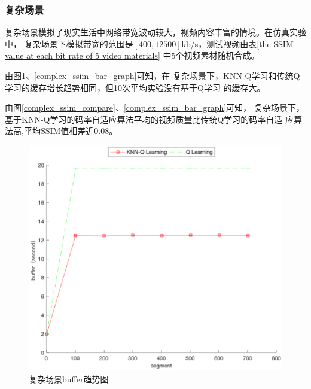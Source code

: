 \documentclass[twocolumn]{article}
\begin{document}
\subsubsection{复杂场景}
复杂场景模拟了现实生活中网络带宽波动较大，视频内容丰富的情境。在仿真实验中，
复杂场景下模拟带宽的范围是$\left[400,12500\right]$kb/s，测试视频由表\ref{the SSIM value at each bit rate of 5 video materials}
中5个视频素材随机合成。

由图\ref{complex_buffer_compare}、\ref{complex_ssim_bar_graph}可知，在
复杂场景下，KNN-Q学习和传统Q学习的缓存增长趋势相同，但10次平均实验没有基于Q学习
的缓存大。

由图\ref{complex_ssim_compare}、\ref{complex_ssim_bar_graph}可知，
复杂场景下，基于KNN-Q学习的码率自适应算法平均的视频质量比传统Q学习的码率自适
应算法高,平均SSIM值相差近0.08。
\begin{figure}[htbp]
\centering
\includegraphics[width=\columnwidth]{complex_buffer_compare}
\caption{复杂场景buffer趋势图}
\label{complex_buffer_compare}
\end{figure}
\end{document}
